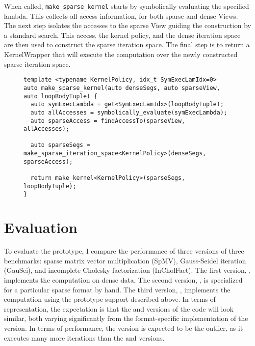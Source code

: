 When called, \verb.make_sparse_kernel. starts by symbolically evaluating the specified lambda.
This collects all access information, for both sparse and dense Views.
The next step isolates the accesses to the sparse View guiding the construction by a standard search.
This access, the kernel policy, and the dense iteration space are then used to construct the sparse iteration space.
The final step is to return a KernelWrapper that will execute the computation over the newly constructed sparse iteration space.

\begin{figure}
\begin{lstlisting}[caption={Abbreviated implementation of the function for creating a computation that automatically constructs the sparse iteration space.}, label=makeSparseKernelAlg]
template <typename KernelPolicy, idx_t SymExecLamIdx=0>
auto make_sparse_kernel(auto denseSegs, auto sparseView, auto loopBodyTuple) {
  auto symExecLambda = get<SymExecLamIdx>(loopBodyTuple);
  auto allAccesses = symbolically_evaluate(symExecLambda);
  auto sparseAccess = findAccessTo(sparseView, allAccesses);

  auto sparseSegs = make_sparse_iteration_space<KernelPolicy>(denseSegs, sparseAccess);

  return make_kernel<KernelPolicy>(sparseSegs, loopBodyTuple);
}
\end{lstlisting}
\end{figure}

\section{Evaluation}
\label{sec:sparseEval}
To evaluate the prototype, I compare the performance of three versions of three benchmarks: sparse matrix vector multiplication (SpMV), Gauss-Seidel iteration (GauSei), and incomplete Cholesky factorization (InCholFact).
The first version, \dense, implements the computation on dense data. 
The second version, \specialized, is specialized for a particular sparse format by hand. 
The third version, \sparseraja, implements the computation using the prototype support described above.
In terms of representation, the expectation is that the \dense{} and \sparseraja{} versions of the code will look similar, both varying significantly from the format-specific implementation of the \specialized{} version.
In terms of performance, the \dense{} version is expected to be the outlier, as it executes many more iterations than the \sparseraja{} and \specialized{} versions.

